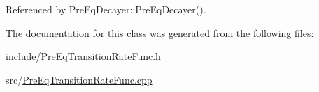 Referenced by Pre\-Eq\-Decayer\-::\-Pre\-Eq\-Decayer().



The documentation for this class was generated from the following files\-:\begin{DoxyCompactItemize}
\item 
include/\hyperlink{PreEqTransitionRateFunc_8h}{Pre\-Eq\-Transition\-Rate\-Func.\-h}\item 
src/\hyperlink{PreEqTransitionRateFunc_8cpp}{Pre\-Eq\-Transition\-Rate\-Func.\-cpp}\end{DoxyCompactItemize}
